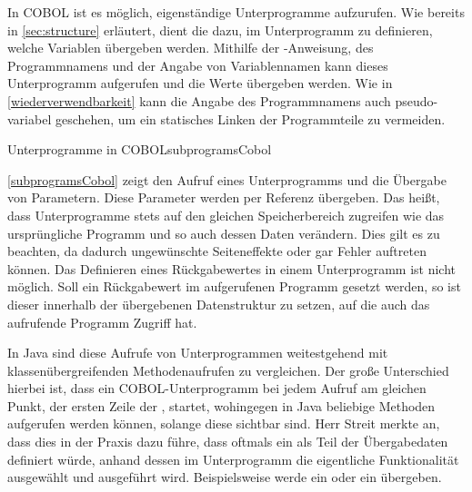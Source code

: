 In COBOL ist es möglich, eigenständige Unterprogramme aufzurufen. Wie bereits in \autoref{sec:structure} erläutert, dient die  dazu, im Unterprogramm zu definieren, welche Variablen übergeben werden. Mithilfe der -Anweisung, des Programmnamens und der Angabe von Variablennamen kann dieses Unterprogramm aufgerufen und die Werte übergeben werden. Wie in \autoref{wiederverwendbarkeit} kann die Angabe des Programmnamens auch pseudo-variabel geschehen, um ein statisches Linken der Programmteile zu vermeiden. 

\begin{codeWithCaption}{Unterprogramme in COBOL}{subprogramsCobol}
\end{codeWithCaption}

\autoref{subprogramsCobol} zeigt den Aufruf eines Unterprogramms und die Übergabe von Parametern. Diese Parameter werden per Referenz übergeben. Das heißt, dass Unterprogramme stets auf den gleichen Speicherbereich zugreifen wie das ursprüngliche Programm und so auch dessen Daten verändern. Dies gilt es zu beachten, da dadurch ungewünschte Seiteneffekte oder gar Fehler auftreten können. Das Definieren eines Rückgabewertes in einem Unterprogramm ist nicht möglich. Soll ein Rückgabewert im aufgerufenen Programm gesetzt werden, so ist dieser innerhalb der übergebenen Datenstruktur zu setzen, auf die auch das aufrufende Programm Zugriff hat. 

In Java sind diese Aufrufe von Unterprogrammen weitestgehend mit klassenübergreifenden Methodenaufrufen zu vergleichen. Der große Unterschied hierbei ist, dass ein COBOL-Unterprogramm bei jedem Aufruf am gleichen Punkt, der ersten Zeile der , startet, wohingegen in Java beliebige Methoden aufgerufen werden können, solange diese sichtbar sind. Herr Streit merkte an, dass dies in der Praxis dazu führe, dass oftmals ein  als Teil der Übergabedaten definiert würde, anhand dessen im Unterprogramm die eigentliche Funktionalität ausgewählt und ausgeführt wird. Beispielsweise werde ein  oder ein  übergeben.